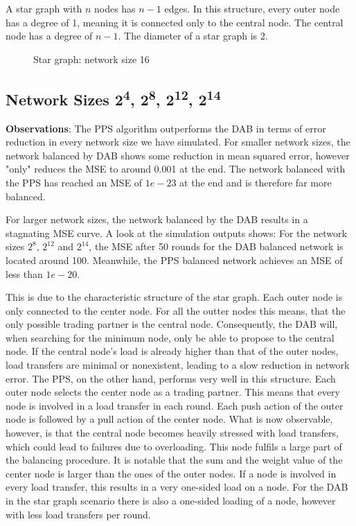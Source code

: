 A star graph with $n$ nodes has $n-1$ edges. In this structure, every outer node has a degree of 1, meaning it is connected only to the central node. The central node has a degree of $n-1$. The diameter of a star graph is 2.
\begin{figure}[H]
    \centering
    
    \caption{Star graph: network size 16}
    \label{fig:stargraphDemo}
\end{figure}
\subsection{Network Sizes 2\textsuperscript{4}, 2\textsuperscript{8}, 2\textsuperscript{12}, 2\textsuperscript{14}}
\textbf{Observations}: The PPS algorithm outperforms the DAB in terms of error reduction in every network size we have simulated. For smaller network sizes, the network balanced by DAB shows some reduction in mean squared error, however "only" reduces the MSE to around 0.001 at the end. The network balanced with the PPS has reached an MSE of $1e-23$ at the end and is therefore far more balanced.

For larger network sizes, the network balanced by the DAB results in a stagnating MSE curve. A look at the simulation outputs shows: For the network sizes $2^{8}$, $2^{12}$ and $2^{14}$, the MSE after 50 rounds for the DAB balanced network is located around 100. Meanwhile, the PPS balanced network achieves an MSE of less than $1e-20$.

This is due to the characteristic structure of the star graph. Each outer node is only connected to the center node. For all the outter nodes this means, that the only possible trading partner is the central node. Consequently, the DAB will, when searching for the minimum node, only be able to propose to the central node. If the central node's load is already higher than that of the outer nodes, load transfers are minimal or nonexistent, leading to a slow reduction in network error. The PPS, on the other hand, performs very well in this structure. Each outer node selects the center node as a trading partner. This means that every node is involved in a load transfer in each round. Each push action of the outer node is followed by a pull action of the center node. What is now observable, however, is that the central node becomes heavily stressed with load transfers, which could lead to failures due to overloading. This node fulfils a large part of the balancing procedure. It is notable that the sum and the weight value of the center node is larger than the ones of the outer nodes. If a node is involved in every load transfer, this results in a very one-sided load on a node. For the DAB in the star graph scenario there is also a one-sided loading of a node, however with less load transfers per round.

